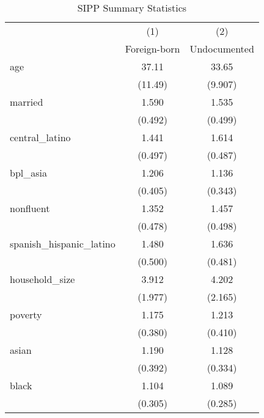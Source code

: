 \begin{table}[htbp]\centering
\def\sym#1{\ifmmode^{#1}\else\(^{#1}\)\fi}
\caption{SIPP Summary Statistics \label{tab:sum}}
\begin{tabular}{l*{2}{c}}
\hline\hline
                    &\multicolumn{1}{c}{(1)}         &\multicolumn{1}{c}{(2)}         \\
                    &Foreign-born         &Undocumented         \\
\hline
age                 &       37.11         &       33.65         \\
                    &     (11.49)         &     (9.907)         \\
[1em]
married             &       1.590         &       1.535         \\
                    &     (0.492)         &     (0.499)         \\
[1em]
central\_latino      &       1.441         &       1.614         \\
                    &     (0.497)         &     (0.487)         \\
[1em]
bpl\_asia            &       1.206         &       1.136         \\
                    &     (0.405)         &     (0.343)         \\
[1em]
nonfluent           &       1.352         &       1.457         \\
                    &     (0.478)         &     (0.498)         \\
[1em]
spanish\_hispanic\_latino&       1.480         &       1.636         \\
                    &     (0.500)         &     (0.481)         \\
[1em]
household\_size      &       3.912         &       4.202         \\
                    &     (1.977)         &     (2.165)         \\
[1em]
poverty             &       1.175         &       1.213         \\
                    &     (0.380)         &     (0.410)         \\
[1em]
asian               &       1.190         &       1.128         \\
                    &     (0.392)         &     (0.334)         \\
[1em]
black               &       1.104         &       1.089         \\
                    &     (0.305)         &     (0.285)         \\

\end{tabular}
\end{table}
